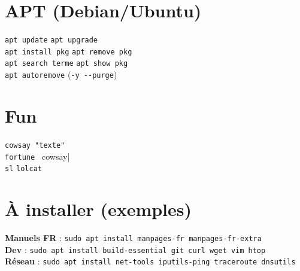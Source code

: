 \documentclass[10pt]{article}
\begin{document}
\begin{multicols}{4}
\section*{APT (Debian/Ubuntu)}
\lstinline|apt update| \quad \lstinline|apt upgrade| \\
\lstinline|apt install pkg| \quad \lstinline|apt remove pkg| \\
\lstinline|apt search terme| \quad \lstinline|apt show pkg| \\
\lstinline|apt autoremove| (\lstinline|-y --purge|) \\

\section*{Fun}
\lstinline|cowsay "texte"| \\
\lstinline|fortune | cowsay| \\
\lstinline|sl| \quad \lstinline|lolcat| \\

\section*{À installer (exemples)}
\textbf{Manuels FR} : \lstinline|sudo apt install manpages-fr manpages-fr-extra| \\
\textbf{Dev} : \lstinline|sudo apt install build-essential git curl wget vim htop| \\
\textbf{Réseau} : \lstinline|sudo apt install net-tools iputils-ping traceroute dnsutils| \\

\end{multicols}
\end{document}
